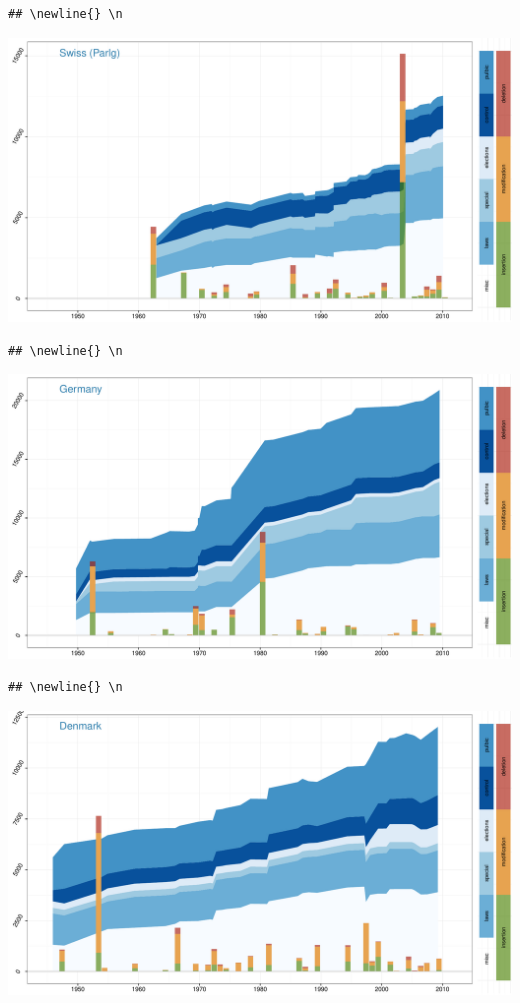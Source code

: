 \documentclass[a4paper, landscape]{article}
\begin{document}
\begin{verbatim}
## \newline{} \n
\end{verbatim}

\includegraphics{country_graphs_files/figure-latex/unnamed-chunk-3-4.pdf}\\

\begin{verbatim}
## \newline{} \n
\end{verbatim}

\includegraphics{country_graphs_files/figure-latex/unnamed-chunk-3-5.pdf}\\

\begin{verbatim}
## \newline{} \n
\end{verbatim}

\includegraphics{country_graphs_files/figure-latex/unnamed-chunk-3-6.pdf}\\
\end{document}

